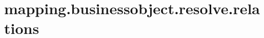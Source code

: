 \section{mapping.businessobject.resolve.relations}
\label{configuration:MappingBusinessobjectResolveRelations}
\AvailableInJavaOnly{\TODO}